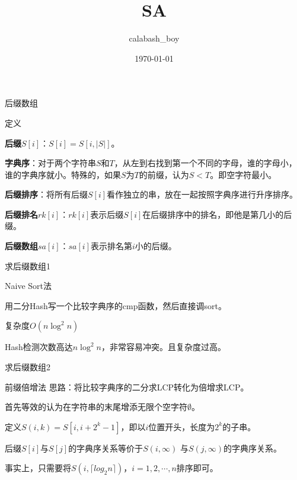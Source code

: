 \documentclass[usenames,dvipsnames]{ctexbeamer}		%
\date{}	%
\title[String]{SA}	%
\author[calabash\_boy]{calabash\_boy} %
\date{\today}
\begin{document}


\begin{frame}	

\titlepage	%
	
\end{frame}		

\begin{frame}{后缀数组}

\begin{block}{定义}

\textbf{后缀$S[i]$}：$S[i] = S[i, |S|]$。

\textbf{字典序}：对于两个字符串$S$和$T$，从左到右找到第一个不同的字母，谁的字母小，谁的字典序就小。特殊的，如果$S$为$T$的前缀，认为$S < T$。即空字符最小。

\pause

\textbf{后缀排序}：将所有后缀$S[i]$看作独立的串，放在一起按照字典序进行升序排序。

\textbf{后缀排名$rk[i]$}：$rk[i]$表示后缀$S[i]$在后缀排序中的排名，即他是第几小的后缀。

\textbf{后缀数组$sa[i]$}：$sa[i]$表示排名第$i$小的后缀。

\color{red}{$rk[sa[i]] = i$}
\end{block}
    
\end{frame}

\begin{frame}{求后缀数组1}

\begin{block}{Naive Sort法}

用二分Hash写一个比较字典序的cmp函数，然后直接调sort。

复杂度$O(n\log^{2}{n})$

\pause
Hash检测次数高达$n\log^{2}{n}$，非常容易冲突。且复杂度过高。

\end{block}

\end{frame}

\begin{frame}{求后缀数组2}
\begin{block}{前缀倍增法}
思路：将比较字典序的二分求LCP转化为倍增求LCP。

\pause

首先等效的认为在字符串的末尾增添无限个空字符$\emptyset$。

\vbox{}
定义$S(i, k) = S[i, i + 2^{k} - 1]$，即以$i$位置开头，长度为$2^k$的子串。

后缀$S[i]$与$S[j]$的字典序关系等价于$S(i, \infty)$ 与$S(j, \infty)$的字典序关系。

事实上，只需要将$S(i, \lceil log_{2}{n} \rceil)$，$i = 1, 2, \cdots, n$排序即可。
\end{block}    
\end{frame}
\end{document}

